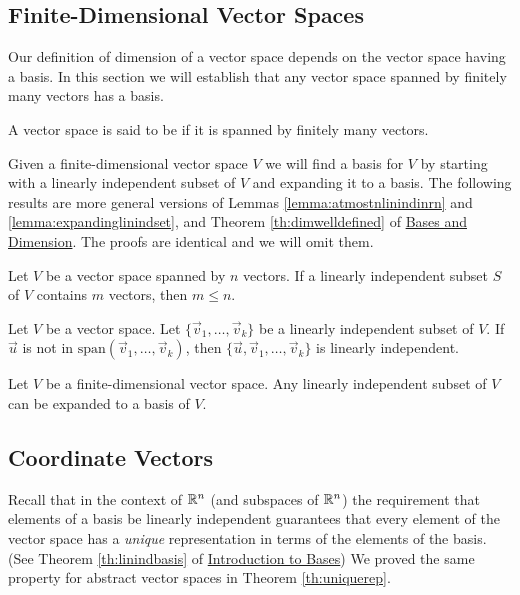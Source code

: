 \documentclass{ximera}
\begin{document}
\subsection*{Finite-Dimensional Vector Spaces}
Our definition of dimension of a vector space depends on the vector space having a basis.  In this section we will establish that any vector space spanned by finitely many vectors has a basis.

\begin{definition}\label{def:findimvectorspace}
A vector space is said to be  if it is spanned by finitely many vectors.
\end{definition}

Given a finite-dimensional vector space $V$ we will find a basis for $V$ by starting with a linearly independent subset of $V$ and expanding it to a basis.  The following results are more general versions of Lemmas \ref{lemma:atmostnlinindinrn} and \ref{lemma:expandinglinindset}, and Theorem \ref{th:dimwelldefined} of \href{https://ximera.osu.edu/oerlinalg/LinearAlgebra/VSP-0035/main}{Bases and Dimension}.  The proofs are identical and we will omit them.
\begin{lemma}\label{lemma:atmostnlinindinabstract}
Let $V$ be a vector space spanned by $n$ vectors.  If a linearly independent subset $S$ of $V$ contains $m$ vectors, then $m\leq n$.
\end{lemma}

\begin{lemma}\label{lemma:expandinglinindsetabstract}
Let $V$ be a vector space.  Let $\{\vec{v}_1,\ldots ,\vec{v}_k\}$ be a linearly independent subset of $V$.  If $\vec{u}$ is not in $\mbox{span}(\vec{v}_1,\ldots ,\vec{v}_k)$, then $\{\vec{u},\vec{v}_1,\ldots ,\vec{v}_k\}$ is linearly independent.
\end{lemma}

\begin{theorem}\label{th:expandtobasisabstract}
Let $V$ be a finite-dimensional vector space.  Any linearly independent subset of $V$ can be expanded to a basis of $V$.
\end{theorem}

\subsection*{Coordinate Vectors}

Recall that in the context of $\mathbb{R}^n$ (and subspaces of $\mathbb{R}^n$) the requirement that elements of a basis be linearly independent guarantees that every element of the vector space has a {\it unique} representation in terms of the elements of the basis.  (See Theorem \ref{th:linindbasis} of \href{https://ximera.osu.edu/oerlinalg/LinearAlgebra/VSP-0030/main}{Introduction to Bases})  We proved the same property for abstract vector spaces in Theorem \ref{th:uniquerep}.
\end{document}
